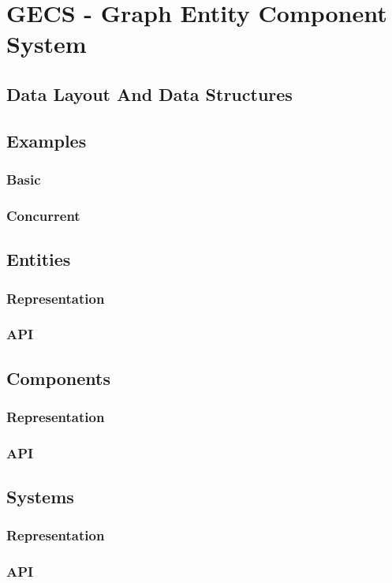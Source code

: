 \section{GECS - Graph Entity Component System}
\label{chap:3}

\subsection{Data Layout And Data Structures}

\subsection{Examples}
\subsubsection{Basic}
\subsubsection{Concurrent}

\subsection{Entities}
\subsubsection{Representation}
\subsubsection{API}

\subsection{Components}
\subsubsection{Representation}
\subsubsection{API}

\subsection{Systems}
\subsubsection{Representation}
\subsubsection{API}

